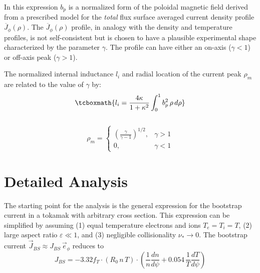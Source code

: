 In this expression $b_p$ is a normalized form of the poloidal magnetic field derived from a prescribed model for the \emph{total} flux surface averaged current density profile $\overline J_\phi(\rho)$. The $\overline J_\phi(\rho)$ profile, in analogy with the density and temperature profiles, is not self-consistent but is chosen to have a plausible experimental shape characterized by the parameter $\gamma$. The profile can have either an on-axis ($\gamma < 1$) or off-axis peak ($\gamma > 1 $).

The normalized internal inductance $l_i$ and radial location of the current peak $\rho_m$ are related to the value of $\gamma$ by: ~
\begin{equation}
	\label{eq:l_i}
	\tcboxmath{
	l_i = \frac{ 4 \kappa }{ 1 + \kappa^2 } \int_0^1 b_p^2 \, \rho \, d\rho
	}
\end{equation}
 ~
\begin{equation}
	\rho_m =
\begin{cases}
   \left( \frac{\gamma}{\gamma - 1} \right)^{1/2},& \gamma > 1 \\
    0,              & \gamma < 1
\end{cases}
\end{equation}

\section{Detailed Analysis}

The starting point for the analysis is the general expression for the bootstrap current in a tokamak with arbitrary cross section.\cite{wesson} This expression can be simplified by assuming (1) equal temperature electrons and ions $T_e = T_i = T$, (2) large aspect ratio $\varepsilon \ll 1$, and (3) negligible collisionality $\nu_* \rightarrow 0$. The bootstrap current $\vec J_{BS} \approx J_{BS} \, \vec e_\phi$ reduces to
\begin{equation}
	J_{BS} = -3.32 f_T \cdot \left( R_0 \, n \, T \right) \cdot \left( \frac{1}{n} \frac{dn}{d\psi} + 0.054 \, \frac{1}{T} \frac{dT}{d\psi} \right)
\end{equation}

